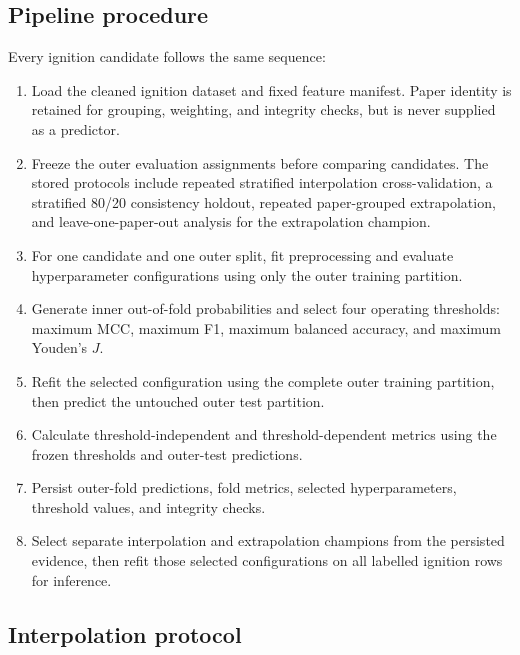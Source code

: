 \subsection{Pipeline procedure}

Every ignition candidate follows the same sequence:

\begin{enumerate}
  \item Load the cleaned ignition dataset and fixed feature manifest. Paper
  identity is retained for grouping, weighting, and integrity checks, but is
  never supplied as a predictor.

  \item Freeze the outer evaluation assignments before comparing candidates.
  The stored protocols include repeated stratified interpolation
  cross-validation, a stratified 80/20 consistency holdout, repeated
  paper-grouped extrapolation, and leave-one-paper-out analysis for the
  extrapolation champion.

  \item For one candidate and one outer split, fit preprocessing and evaluate
  hyperparameter configurations using only the outer training partition.

  \item Generate inner out-of-fold probabilities and select four operating
  thresholds: maximum MCC, maximum F1, maximum balanced accuracy, and maximum
  Youden's \(J\).

  \item Refit the selected configuration using the complete outer training
  partition, then predict the untouched outer test partition.

  \item Calculate threshold-independent and threshold-dependent metrics using
  the frozen thresholds and outer-test predictions.

  \item Persist outer-fold predictions, fold metrics, selected
  hyperparameters, threshold values, and integrity checks.

  \item Select separate interpolation and extrapolation champions from the
  persisted evidence, then refit those selected configurations on all labelled
  ignition rows for inference.
\end{enumerate}

\subsection{Interpolation protocol}

